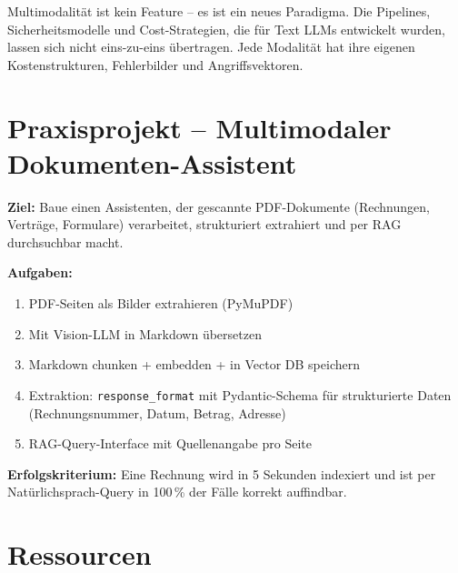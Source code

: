 \par\mbox{}\par
\begin{merkeEnv}
Multimodalität ist kein Feature -- es ist ein neues Paradigma. Die Pipelines, Sicherheitsmodelle und Cost-Strategien, die für Text LLMs entwickelt wurden, lassen sich nicht eins-zu-eins übertragen. Jede Modalität hat ihre eigenen Kostenstrukturen, Fehlerbilder und Angriffsvektoren.
\end{merkeEnv}

\section{Praxisprojekt -- Multimodaler Dokumenten-Assistent}

\textbf{Ziel:} Baue einen Assistenten, der gescannte PDF-Dokumente (Rechnungen, Verträge, Formulare) verarbeitet, strukturiert extrahiert und per RAG durchsuchbar macht.

\textbf{Aufgaben:}
\begin{enumerate}[leftmargin=*]
    \item PDF-Seiten als Bilder extrahieren (PyMuPDF)
    \item Mit Vision-LLM in Markdown übersetzen
    \item Markdown chunken + embedden + in Vector DB speichern
    \item Extraktion: \texttt{response\_format} mit Pydantic-Schema für strukturierte Daten (Rechnungsnummer, Datum, Betrag, Adresse)
    \item RAG-Query-Interface mit Quellenangabe pro Seite
\end{enumerate}

\textbf{Erfolgskriterium:} Eine Rechnung wird in 5 Sekunden indexiert und ist per Natürlichsprach-Query in 100\,\% der Fälle korrekt auffindbar.

\section{Ressourcen}


